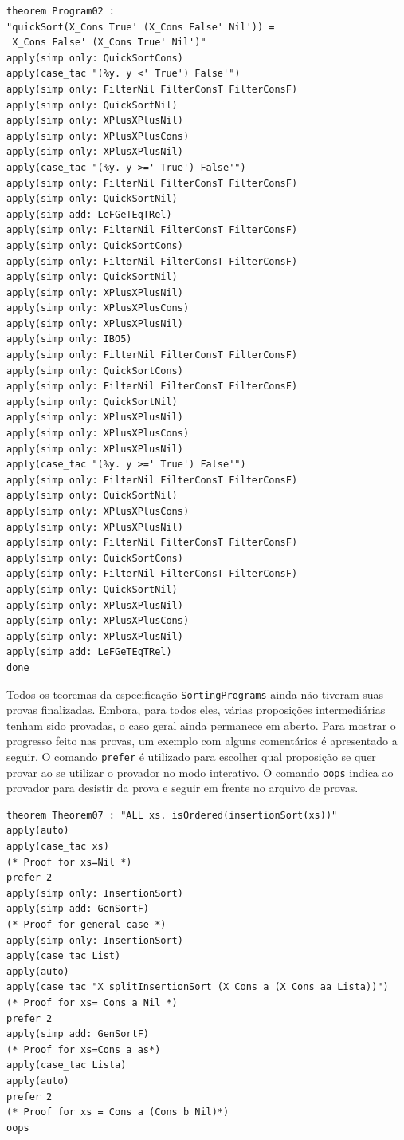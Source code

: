 \begin{Verbatim}
theorem Program02 :
"quickSort(X_Cons True' (X_Cons False' Nil')) =
 X_Cons False' (X_Cons True' Nil')"
apply(simp only: QuickSortCons)
apply(case_tac "(%y. y <' True') False'")
apply(simp only: FilterNil FilterConsT FilterConsF)
apply(simp only: QuickSortNil)
apply(simp only: XPlusXPlusNil)
apply(simp only: XPlusXPlusCons)
apply(simp only: XPlusXPlusNil)
apply(case_tac "(%y. y >=' True') False'")
apply(simp only: FilterNil FilterConsT FilterConsF)
apply(simp only: QuickSortNil)
apply(simp add: LeFGeTEqTRel)
apply(simp only: FilterNil FilterConsT FilterConsF)
apply(simp only: QuickSortCons)
apply(simp only: FilterNil FilterConsT FilterConsF)
apply(simp only: QuickSortNil)
apply(simp only: XPlusXPlusNil)
apply(simp only: XPlusXPlusCons)
apply(simp only: XPlusXPlusNil)
apply(simp only: IBO5)
apply(simp only: FilterNil FilterConsT FilterConsF)
apply(simp only: QuickSortCons)
apply(simp only: FilterNil FilterConsT FilterConsF)
apply(simp only: QuickSortNil)
apply(simp only: XPlusXPlusNil)
apply(simp only: XPlusXPlusCons)
apply(simp only: XPlusXPlusNil)
apply(case_tac "(%y. y >=' True') False'")
apply(simp only: FilterNil FilterConsT FilterConsF)
apply(simp only: QuickSortNil)
apply(simp only: XPlusXPlusCons)
apply(simp only: XPlusXPlusNil)
apply(simp only: FilterNil FilterConsT FilterConsF)
apply(simp only: QuickSortCons)
apply(simp only: FilterNil FilterConsT FilterConsF)
apply(simp only: QuickSortNil)
apply(simp only: XPlusXPlusNil)
apply(simp only: XPlusXPlusCons)
apply(simp only: XPlusXPlusNil)
apply(simp add: LeFGeTEqTRel)
done
\end{Verbatim}

Todos os teoremas da especificação \Verb.SortingPrograms. ainda não tiveram suas provas finalizadas.
Embora, para todos eles, várias proposições intermediárias tenham sido provadas, o caso geral ainda permanece em aberto.
Para mostrar o progresso feito nas provas, um exemplo com alguns comentários é apresentado a seguir.
O comando \Verb.prefer. é utilizado para escolher qual proposição se quer provar ao se utilizar o provador \Isabelle no modo interativo.
O comando \Verb.oops. indica ao provador para desistir da prova e seguir em frente no arquivo de provas.

\begin{Verbatim}
theorem Theorem07 : "ALL xs. isOrdered(insertionSort(xs))"
apply(auto)
apply(case_tac xs)
(* Proof for xs=Nil *)
prefer 2
apply(simp only: InsertionSort)
apply(simp add: GenSortF)
(* Proof for general case *)
apply(simp only: InsertionSort)
apply(case_tac List)
apply(auto)
apply(case_tac "X_splitInsertionSort (X_Cons a (X_Cons aa Lista))")
(* Proof for xs= Cons a Nil *)
prefer 2
apply(simp add: GenSortF)
(* Proof for xs=Cons a as*)
apply(case_tac Lista)
apply(auto)
prefer 2
(* Proof for xs = Cons a (Cons b Nil)*)
oops
\end{Verbatim}
